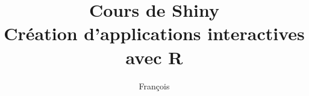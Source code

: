 \documentclass{article}
\begin{document}
\title{Cours de Shiny \\ Création d'applications interactives avec R}

\author{François}
\maketitle
\end{document}
